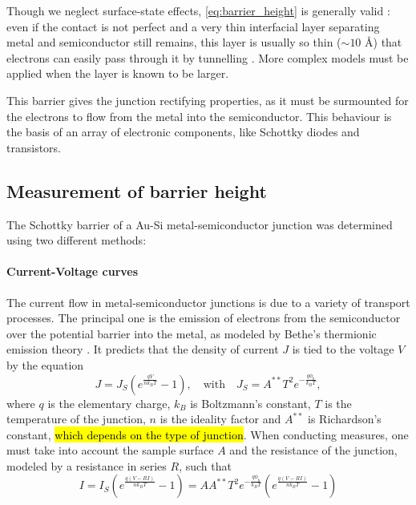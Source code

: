 Though we neglect surface-state effects, \autoref{eq:barrier_height} is generally valid \cite{sze_physics_2007}:
even if the contact is not perfect and a very thin interfacial layer separating metal and semiconductor still remains, this layer is usually so thin ($\sim 10$ \AA) that electrons can easily pass through it by tunnelling \cite{rhoderick_physics_1970}.
More complex models must be applied when the layer is known to be larger.

This barrier gives the junction rectifying properties, as it must be surmounted for the electrons to flow from the metal into the semiconductor.
This behaviour is the basis of an array of electronic components, like Schottky diodes and transistors.

\subsection{Measurement of barrier height}
The Schottky barrier of a Au-Si metal-semiconductor junction was determined using two different methods:

\paragraph{Current-Voltage curves}
The current flow in metal-semiconductor junctions is due to a variety of transport processes.
The principal one is the emission of electrons from the semiconductor over the potential barrier into the metal, as modeled by Bethe's thermionic emission theory \cite{sze_physics_2007}.
It predicts that the density of current $J$ is tied to the voltage $V$ by the equation
\begin{equation} \label{eq:thermionic_emission_current}
    J = J_S \left( e^{\frac{qV}{n k_B T}} - 1 \right), \quad \text{{with}} \quad J_S = A^{**} T^2 e^{-\frac{q \phi_b}{k_B T}},
\end{equation}
where $q$ is the elementary charge, $k_B$ is Boltzmann's constant, $T$ is the temperature of the junction, $n$ is the ideality factor and $A^{**}$ is Richardson's constant, \hl{which depends on the type of junction}.
When conducting measures, one must take into account the sample surface $A$ and the resistance of the junction, modeled by a resistance in series $R$, such that
\begin{equation} \label{eq:iv_curve}
    I = I_S \left( e^{\frac{q (V- RI)}{n k_B T}} - 1\right) = A A^{**} T^2 e^{-\frac{q\phi_b}{k_BT}} \left( e^{\frac{q (V- RI)}{n k_B T}} - 1\right)
\end{equation}

